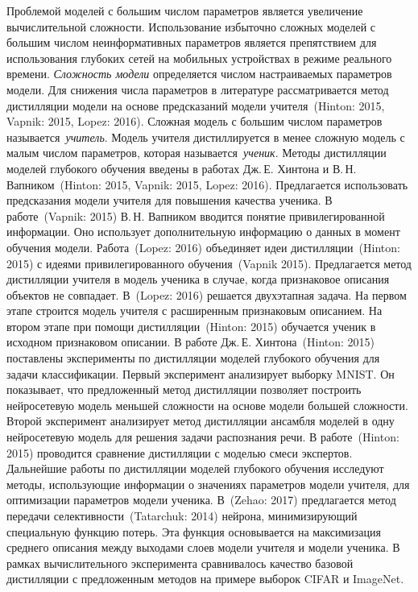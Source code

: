 \documentclass{dissert}
\begin{document}
Проблемой моделей с большим числом параметров является увеличение вычислительной сложности.
Использование избыточно сложных моделей с большим числом неинформативных параметров является препятствием для использования глубоких сетей на мобильных устройствах в режиме реального времени. \textit{Сложность модели} определяется числом настраиваемых параметров модели.
Для снижения числа параметров в литературе рассматривается метод дистилляции модели на основе предсказаний модели учителя~(Hinton: 2015, Vapnik: 2015, Lopez: 2016).
Сложная модель с большим числом параметров называется~\textit{учитель}. Модель учителя дистиллируется в менее сложную модель с малым числом параметров, которая называется~\textit{ученик}.
Методы дистилляции моделей глубокого обучения введены в работах Дж.\,Е. Хинтона и В.\,Н. Вапником~(Hinton: 2015, Vapnik: 2015, Lopez: 2016).
Предлагается использовать предсказания модели учителя для повышения качества ученика.
В работе~(Vapnik: 2015) В.\,Н. Вапником вводится понятие привилегированной информации. Оно использует дополнительную информацию о данных в момент обучения модели.
Работа~(Lopez: 2016) объединяет идеи дистилляции~(Hinton: 2015) с идеями привилегированного обучения~(Vapnik 2015). Предлагается метод дистилляции учителя в модель ученика в случае, когда признаковое описания объектов не совпадает.
В~(Lopez: 2016) решается двухэтапная задача. На первом этапе строится модель учителя с расширенным признаковым описанием.
На втором этапе при помощи дистилляции~(Hinton: 2015) обучается ученик в исходном признаковом описании.
В работе Дж.\,Е. Хинтона~(Hinton: 2015) поставлены эксперименты по дистилляции моделей глубокого обучения для задачи классификации.
Первый эксперимент анализирует выборку MNIST. Он показывает, что предложенный метод дистилляции позволяет построить нейросетевую модель меньшей сложности на основе модели большей сложности.
Второй эксперимент анализирует метод дистилляции ансамбля моделей в одну нейросетевую модель для решения задачи распознания речи. В работе~(Hinton: 2015) проводится сравнение дистилляции с моделью смеси экспертов.
Дальнейшие работы по дистилляции моделей глубокого обучения исследуют методы, использующие информации о значениях параметров модели учителя, для оптимизации параметров модели ученика. В~(Zehao: 2017) предлагается метод передачи селективности~(Tatarchuk: 2014) нейрона, минимизирующий специальную функцию потерь. Эта функция основывается на максимизация среднего описания между выходами слоев модели учителя и модели ученика. В рамках вычислительного эксперимента сравнивалось качество базовой дистилляции с предложенным методов на примере выборок CIFAR и ImageNet.
\end{document}
